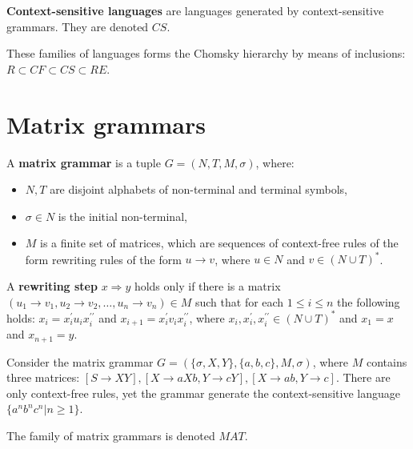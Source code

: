 \begin{definition}
{\bf Context-sensitive languages} are languages generated by context-sensitive grammars. They are denoted $CS$.
\end{definition}

These families of languages forms the Chomsky hierarchy by means of inclusions: $R \subset CF \subset CS \subset RE$.


\section{Matrix grammars} %
\label{sec:matrix_grammars}

\begin{definition}
A {\bf matrix grammar} is a tuple $G = (N,T,M,\sigma)$, where:
\begin{itemize}
  \item $N, T$ are disjoint alphabets of non-terminal and terminal symbols,
  \item $\sigma\in N$ is the initial non-terminal,
  \item $M$ is a finite set of matrices, which are sequences of context-free rules of the form rewriting rules of the form $u\rightarrow v$, where $u\in N$ and $v\in (N\cup T)^*$.
\end{itemize}
\end{definition}

\begin{definition}
A {\bf rewriting step} $x\Rightarrow y$ holds only if there is a matrix $(u_1\rightarrow v_1, u_2\rightarrow v_2, \dots, u_n\rightarrow v_n) \in M$ such that for each $1\leq i\leq n$ the following holds: $x_i = x_i^{\prime}u_ix_i^{\prime\prime}$ and $x_{i+1} = x_i^{\prime}v_ix_i^{\prime\prime}$, where $x_i, x_i^{\prime}, x_i^{\prime\prime} \in (N\cup T)^*$ and $x_1 = x$ and $x_{n+1} = y$.
\end{definition}

\begin{example}
Consider the matrix grammar $G=(\{\sigma, X,Y\}, \{ a,b,c\}, M, \sigma)$, where $M$ contains three matrices: $[S\rightarrow XY], [X\rightarrow aXb, Y\rightarrow cY], [X\rightarrow ab, Y\rightarrow c]$. There are only context-free rules, yet the grammar generate the context-sensitive language $\{a^nb^nc^n|n\geq 1\}$.
\end{example}

The family of matrix grammars is denoted $MAT$.

